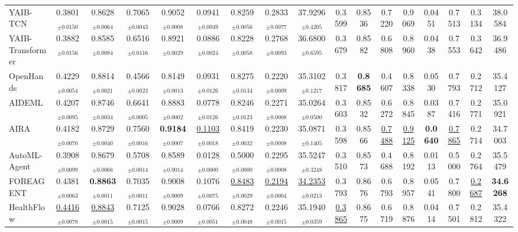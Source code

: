 \begin{table}[t]
{\begin{tabular}{lcccccccccccccccc}
YAIB-TCN & 0.3801$_{\pm 0.0150}$ & 0.8628$_{\pm 0.0064}$ & 0.7065$_{\pm 0.0043}$ & 0.9052$_{\pm 0.0008}$ & 0.0941$_{\pm 0.0049}$ & 0.8259$_{\pm 0.0056}$ & 0.2833$_{\pm 0.0077}$ & 37.9296$_{\pm 0.4205}$ & 0.3599 & 0.8536 & 0.7220 & 0.9069 & 0.0451 & 0.7513 & 0.3134 & 38.0584 \\
YAIB-Transformer & 0.3882$_{\pm 0.0156}$ & 0.8585$_{\pm 0.0084}$ & 0.6516$_{\pm 0.0116}$ & 0.8921$_{\pm 0.0029}$ & 0.0886$_{\pm 0.0024}$ & 0.8228$_{\pm 0.0058}$ & 0.2768$_{\pm 0.0093}$ & 36.6800$_{\pm 0.6595}$ & 0.3679 & 0.8582 & 0.6808 & 0.8960 & 0.0438 & 0.7553 & 0.3642 & 36.9486 \\
\midrule
OpenHands & 0.4229$_{\pm 0.0054}$ & 0.8814$_{\pm 0.0021}$ & 0.4566$_{\pm 0.0023}$ & 0.8149$_{\pm 0.0013}$ & 0.0931$_{\pm 0.0126}$ & 0.8275$_{\pm 0.0134}$ & 0.2220$_{\pm 0.0009}$ & 35.3102$_{\pm 0.1217}$ & 0.3817 & \textbf{0.8685} & 0.4607 & 0.8338 & 0.0530 & 0.7793 & 0.2712 & 35.4127 \\
AIDEML & 0.4207$_{\pm 0.0095}$ & 0.8746$_{\pm 0.0034}$ & 0.6641$_{\pm 0.0005}$ & 0.8883$_{\pm 0.0002}$ & 0.0778$_{\pm 0.0126}$ & 0.8246$_{\pm 0.0123}$ & 0.2271$_{\pm 0.0008}$ & 35.0264$_{\pm 0.0500}$ & 0.3603 & 0.8532 & 0.6272 & 0.8845 & 0.0387 & 0.7416 & 0.2771 & 35.0921 \\
AIRA & 0.4182$_{\pm 0.0070}$ & 0.8729$_{\pm 0.0040}$ & 0.7560$_{\pm 0.0016}$ & \textbf{0.9184}$_{\pm 0.0007}$ & \underline{0.1103}$_{\pm 0.0018}$ & 0.8419$_{\pm 0.0032}$ & 0.2230$_{\pm 0.0008}$ & 35.0871$_{\pm 0.1405}$ & 0.3598 & 0.8566 & \underline{0.7488} & \underline{0.9125} & \textbf{0.0640} & \underline{0.7865} & 0.2714 & 34.7003 \\
AutoML-Agent & 0.3908$_{\pm 0.0099}$ & 0.8679$_{\pm 0.0066}$ & 0.5708$_{\pm 0.0014}$ & 0.8589$_{\pm 0.0014}$ & 0.0128$_{\pm 0.0000}$ & 0.5000$_{\pm 0.0000}$ & 0.2295$_{\pm 0.0008}$ & 35.5247$_{\pm 0.3248}$ & 0.3510 & 0.8573 & 0.4688 & 0.8192 & 0.0113 & 0.5000 & 0.2764 & 35.5479 \\
FOREAGENT & 0.4381$_{\pm 0.0063}$ & \textbf{0.8863}$_{\pm 0.0011}$ & 0.7035$_{\pm 0.0011}$ & 0.9008$_{\pm 0.0009}$ & 0.1076$_{\pm 0.0075}$ & \underline{0.8483}$_{\pm 0.0029}$ & \underline{0.2194}$_{\pm 0.0004}$ & \underline{34.2353}$_{\pm 0.0213}$ & 0.3793 & 0.8676 & 0.6793 & 0.8957 & 0.0541 & 0.7800 & \underline{0.2687} & \textbf{34.6268} \\
HealthFlow & \underline{0.4416}$_{\pm 0.0078}$ & \underline{0.8843}$_{\pm 0.0015}$ & 0.7125$_{\pm 0.0015}$ & 0.9028$_{\pm 0.0009}$ & 0.0766$_{\pm 0.0051}$ & 0.8272$_{\pm 0.0048}$ & 0.2246$_{\pm 0.0015}$ & 35.1940$_{\pm 0.0359}$ & \underline{0.3865} & 0.8675 & 0.6719 & 0.8876 & 0.0414 & 0.7501 & 0.2812 & 35.4322 \\

\end{tabular}}
\end{table}
